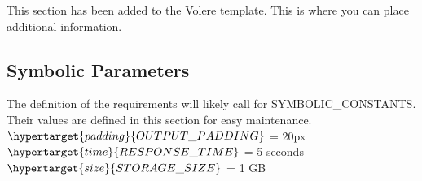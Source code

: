 \documentclass[12pt, titlepage]{article}
\begin{document}
This section has been added to the Volere template.  This is where you can place
additional information.

\subsection{Symbolic Parameters}

The definition of the requirements will likely call for SYMBOLIC\_CONSTANTS.
Their values are defined in this section for easy maintenance.\\

\noindent $\hypertarget{padding}{OUTPUT\_PADDING}$ = 20px \\
\noindent $\hypertarget{time}{RESPONSE\_TIME}$ = 5 seconds \\
\noindent $\hypertarget{size}{STORAGE\_SIZE}$ = 1 GB\\
\end{document}
